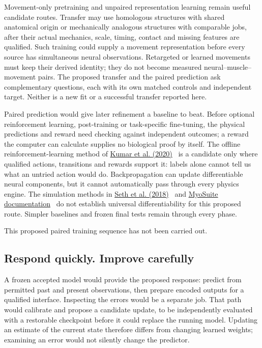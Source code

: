 Movement-only pretraining and unpaired representation learning remain useful
candidate routes. Transfer may use homologous structures with shared anatomical
origin or mechanically analogous structures with comparable jobs, after their
actual mechanics, scale, timing, contact and missing features are qualified.
Such training could supply a movement representation before every source has
simultaneous neural observations. Retargeted or learned movements must keep
their derived identity; they do not become measured neural--muscle--movement
pairs. The proposed transfer and the paired prediction ask complementary
questions, each with its own matched controls and independent target. Neither
is a new fit or a successful transfer reported here.

Paired prediction would give later refinement a baseline to beat. Before
optional reinforcement learning, post-training or task-specific fine-tuning,
the physical predictions and reward need checking against independent
outcomes; a reward the computer can calculate supplies no biological proof
by itself. The offline reinforcement-learning method of \href{https://arxiv.org/abs/2006.04779v3}{Kumar et al. (2020)}~\cite{cql2020} is a
candidate only where qualified actions, transitions and rewards support it: labels alone cannot tell us what an untried action
would do. Backpropagation can update differentiable neural components, but
it cannot automatically pass through every physics engine. The simulation
methods in \href{https://journals.plos.org/ploscompbiol/article?id=10.1371/journal.pcbi.1006223}{Seth et al. (2018)}~\cite{opensim2018} and \href{https://myosuite.readthedocs.io/en/latest/}{MyoSuite documentation}~\cite{myosuiteDocsUndated} do not establish
universal differentiability for this proposed route. Simpler baselines and frozen final
tests remain through every phase.


This proposed paired training sequence has not been carried out.

\subsection{Respond quickly. Improve carefully}
A frozen accepted model would provide the proposed response: predict from
permitted past and present observations, then prepare encoded outputs for a
qualified interface. Inspecting the errors would be a separate job. That path
would calibrate and propose a candidate update, to be independently evaluated
with a restorable checkpoint before it could replace the running model.
Updating an estimate of the current state therefore differs from changing
learned weights; examining an error would not silently change the predictor.

